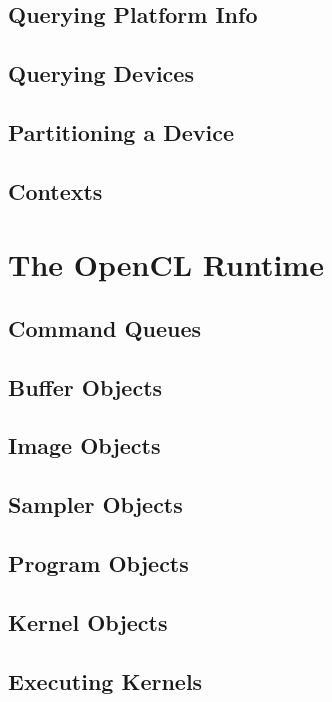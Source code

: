 \subsection{Querying Platform Info}

\subsection{Querying Devices}

\subsection{Partitioning a Device}

\subsection{Contexts}


\section{The OpenCL Runtime}

\subsection{Command Queues}

\subsection{Buffer Objects}

\subsection{Image Objects}

\subsection{Sampler Objects}

\subsection{Program Objects}

\subsection{Kernel Objects }

\subsection{Executing Kernels}

